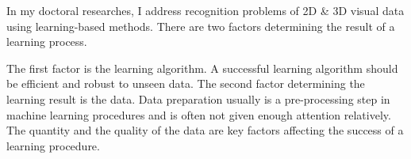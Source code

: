\documentclass{iitthesis}
\begin{document}
 \label{sec: contribution}

%

In my doctoral researches, I address recognition problems of 2D \& 3D visual data using learning-based methods. There are two factors determining the result of a learning process. 

The first factor is the learning algorithm. A successful learning algorithm should be efficient and robust to unseen data. The second factor determining the learning result is the data. Data preparation usually is a pre-processing step in machine learning procedures and is often not given enough attention relatively. The quantity and the quality of the data are key factors affecting the success of a learning procedure. 
\end{document}
